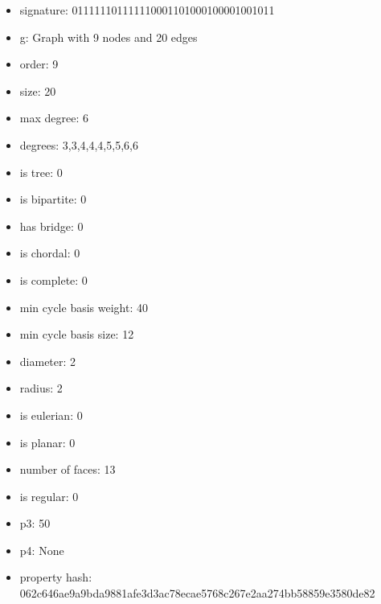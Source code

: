 \newpage
\begin{figure}
\end{figure}
\begin{itemize}
\item signature: 011111101111110001101000100001001011
\item g: Graph with 9 nodes and 20 edges
\item order: 9
\item size: 20
\item max degree: 6
\item degrees: 3,3,4,4,4,5,5,6,6
\item is tree: 0
\item is bipartite: 0
\item has bridge: 0
\item is chordal: 0
\item is complete: 0
\item min cycle basis weight: 40
\item min cycle basis size: 12
\item diameter: 2
\item radius: 2
\item is eulerian: 0
\item is planar: 0
\item number of faces: 13
\item is regular: 0
\item p3: 50
\item p4: None
\item property hash: 062c646ae9a9bda9881afe3d3ac78ecae5768c267e2aa274bb58859e3580de82
\end{itemize}

